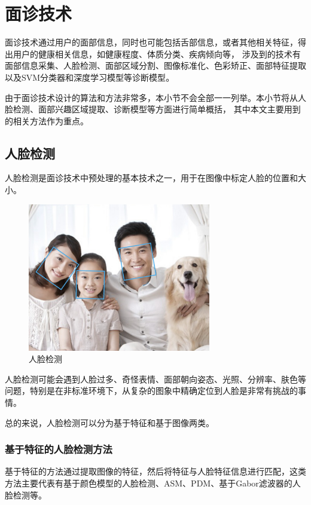 \section{面诊技术}
面诊技术通过用户的面部信息，同时也可能包括舌部信息，或者其他相关特征，得出用户的健康相关信息，如健康程度、体质分类、疾病倾向等，
涉及到的技术有面部信息采集、人脸检测、面部区域分割、图像标准化、色彩矫正、面部特征提取以及SVM分类器和深度学习模型等诊断模型\cite{宋海贝2018中医面诊信息自动识别方法研究进展, 林锋2019中医面诊系统调研报告}。

由于面诊技术设计的算法和方法非常多，本小节不会全部一一列举。本小节将从人脸检测、面部兴趣区域提取、诊断模型等方面进行简单概括，
其中本文主要用到的相关方法作为重点。

\subsection{人脸检测}
人脸检测是面诊技术中预处理的基本技术之一，用于在图像中标定人脸的位置和大小。

\begin{figure}[h]
    \centering
    \includegraphics[width=8cm]{images/face_detcetion.png}
    \caption{人脸检测 \protect\footnotemark}
    \label{fig:face_plus }
\end{figure}

人脸检测可能会遇到人脸过多、奇怪表情、面部朝向姿态、光照、分辨率、肤色等问题，特别是在非标准环境下，从复杂的图象中精确定位到人脸是非常有挑战的事情。

总的来说，人脸检测可以分为基于特征和基于图像两类\cite{kumar2019face}。

\subsubsection{基于特征的人脸检测方法}
基于特征的方法通过提取图像的特征，然后将特征与人脸特征信息进行匹配，这类方法主要代表有基于颜色模型的人脸检测、ASM、PDM、基于Gabor滤波器的人脸检测等。

